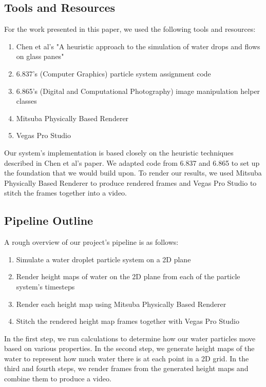 \documentclass[10pt,twocolumn,letterpaper]{article}
\begin{document}
\subsection{Tools and Resources}

For the work presented in this paper, we used the following tools and resources:

\begin{enumerate}
    \item Chen et al's "A heuristic approach to the simulation of water drops and flows on glass panes" \cite{paper}
    \item 6.837's (Computer Graphics) particle system assignment code
    \item 6.865's (Digital and Computational Photography) image manipulation helper classes
    \item Mitsuba Physically Based Renderer \cite{Mitsuba}
    \item Vegas Pro Studio
\end{enumerate}

Our system's implementation is based closely on the heuristic techniques described in Chen et al's paper. We adapted code from 6.837 and 6.865 to set up the foundation that we would build upon. To render our results, we used Mitsuba Physically Based Renderer to produce rendered frames and Vegas Pro Studio to stitch the frames together into a video.

\subsection{Pipeline Outline}

A rough overview of our project's pipeline is as follows:

\begin{enumerate}
    \item Simulate a water droplet particle system on a 2D plane
    \item Render height maps of water on the 2D plane from each of the particle system's timesteps
    \item Render each height map using Mitsuba Physically Based Renderer
    \item Stitch the rendered height map frames together with Vegas Pro Studio
\end{enumerate}

In the first step, we run calculations to determine how our water particles move based on various properties. In the second step, we generate height maps of the water to represent how much water there is at each point in a 2D grid. In the third and fourth steps, we render frames from the generated height maps and combine them to produce a video.
\end{document}

